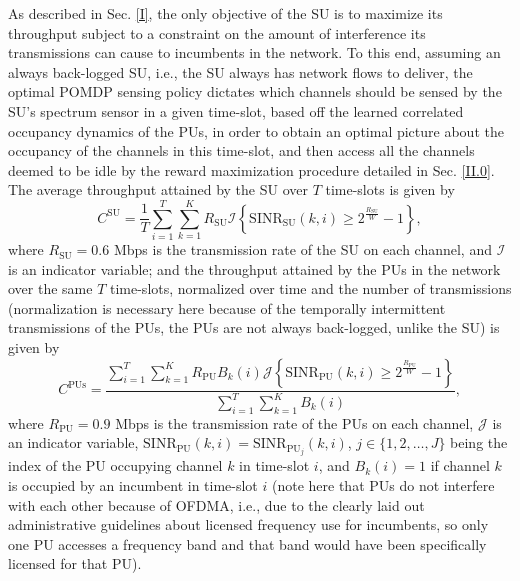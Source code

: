 \documentclass[12pt, draftcls, onecolumn]{IEEEtran}
\begin{document}
As described in Sec. \ref{I}, the only objective of the SU is to maximize its throughput subject to a constraint on the amount of interference its transmissions can cause to incumbents in the network. To this end, assuming an always back-logged SU, i.e., the SU always has network flows to deliver, the optimal POMDP sensing policy dictates which channels should be sensed by the SU's spectrum sensor in a given time-slot, based off the learned correlated occupancy dynamics of the PUs, in order to obtain an optimal picture about the occupancy of the channels in this time-slot, and then access all the channels deemed to be idle by the reward maximization procedure detailed in Sec. \ref{II.0}. The average throughput attained by the SU over $T$ time-slots is given by
\begin{equation}\label{30}
    C^{\text{SU}}=\frac{1}{T}\sum_{i=1}^{T}\sum_{k=1}^{K}R_{\text{SU}}\mathcal{I}\left\{\text{SINR}_{\text{SU}}(k,i) \geq 2^{\frac{R_{\text{SU}}}{W}}-1\right\},
\end{equation}
where $R_{\text{SU}}{=}0.6$ Mbps is the transmission rate of the SU on each channel, and $\mathcal{I}$ is an indicator variable; and the throughput attained by the PUs in the network over the same $T$ time-slots, normalized over time and the number of transmissions (normalization is necessary here because of the temporally intermittent transmissions of the PUs, the PUs are not always back-logged, unlike the SU) is given by
\begin{equation}\label{31}
    C^{\text{PUs}}=\frac{\sum_{i=1}^{T}\sum_{k=1}^{K}R_{\text{PU}}B_{k}(i)\mathcal{J}\left\{\text{SINR}_{\text{PU}}(k,i) \geq 2^{\frac{R_{\text{PU}}}{W}}-1\right\}}{\sum_{i=1}^{T}\sum_{k=1}^{K}B_{k}(i)},
\end{equation}
where $R_{\text{PU}}{=}0.9$ Mbps is the transmission rate of the PUs on each channel, $\mathcal{J}$ is an indicator variable, $\text{SINR}_{\text{PU}}(k,i){=}\text{SINR}_{\text{PU}_{j}}(k,i)$, $j{\in}\{1,2,\dots,J\}$ being the index of the PU occupying channel $k$ in time-slot $i$, and $B_{k}(i){=}1$ if channel $k$ is occupied by an incumbent in time-slot $i$ (note here that PUs do not interfere with each other because of OFDMA, i.e., due to the clearly laid out administrative guidelines about licensed frequency use for incumbents, so only one PU accesses a frequency band and that band would have been specifically licensed for that PU).
\end{document}
